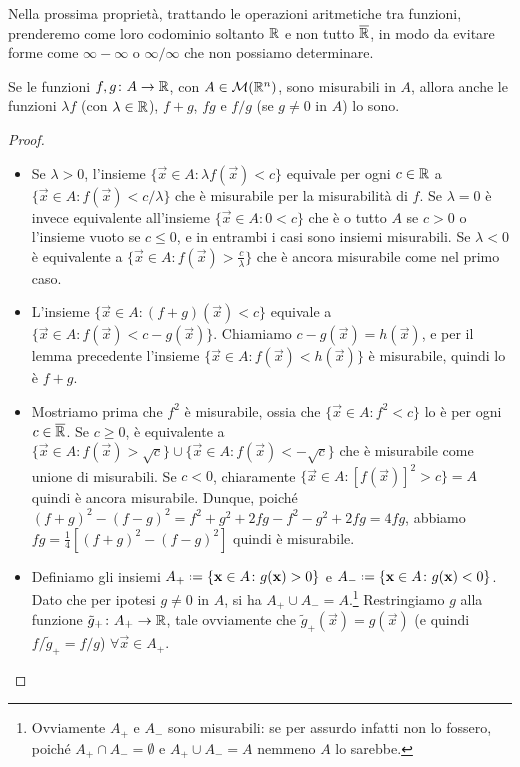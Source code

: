 Nella prossima proprietà, trattando le operazioni aritmetiche tra funzioni, prenderemo come loro codominio soltanto $\mathbb{R}$ e non tutto $\overline{\mathbb{R}}$, in modo da evitare forme come $\infty-\infty$ o $\infty/\infty$ che non possiamo determinare.
\begin{proprieta} \label{pr:operazioni-funzioni-misurabili}
	Se le funzioni $f,g\colon A\to\mathbb{R}$, con $A\in\mathcal M(\mathbb{R}^n)$, sono misurabili in $A$, allora anche le funzioni $\lambda f$ (con $\lambda\in\mathbb{R}$), $f+g$, $fg$ e $f/g$ (se $g\neq0$ in $A$) lo sono.
\end{proprieta}
\begin{proof}
	\begin{itemize}
		\item Se $\lambda>0$, l'insieme $\{\vec x\in A\colon \lambda f(\vec x)<c\}$ equivale per ogni $c\in\mathbb{R}$ a $\{\vec x\in A\colon f(\vec x)<c/\lambda\}$ che è misurabile per la misurabilità di $f$.
			Se $\lambda=0$ è invece equivalente all'insieme $\{\vec x\in A\colon 0<c\}$ che è o tutto $A$ se $c>0$ o l'insieme vuoto se $c\leq 0$, e in entrambi i casi sono insiemi misurabili.
			Se $\lambda<0$ è equivalente a $\{\vec x\in A\colon f(\vec x)>\frac{c}{\lambda}\}$ che è ancora misurabile come nel primo caso.
		\item L'insieme $\{\vec x\in A\colon (f+g)(\vec x)<c\}$ equivale a $\{\vec x\in A\colon f(\vec x)<c-g(\vec x)\}$.
			Chiamiamo $c-g(\vec x)=h(\vec x)$, e per il lemma precedente l'insieme $\{\vec x\in A\colon f(\vec x)<h(\vec x)\}$ è misurabile, quindi lo è $f+g$.
		\item Mostriamo prima che $f^2$ è misurabile, ossia che $\{\vec x\in A\colon f^2<c\}$ lo è per ogni $c\in\overline{\mathbb{R}}$.
			Se $c\geq 0$, è equivalente a $\{\vec x\in A\colon f(\vec x)>\sqrt{c}\}\cup\{\vec x\in A\colon f(\vec x)<-\sqrt{c}\}$ che è misurabile come unione di misurabili.
			Se $c<0$, chiaramente $\{\vec x\in A\colon [f(\vec x)]^2>c\}=A$ quindi è ancora misurabile.
			Dunque, poich\'e $(f+g)^2-(f-g)^2=f^2+g^2+2fg-f^2-g^2+2fg=4fg$, abbiamo $fg=\frac14[(f+g)^2-(f-g)^2]$ quindi è misurabile.
		\item Definiamo gli insiemi $A_+\defeq\{\vec x\in A\colon g(\vec x)>0\}$ e $A_-\defeq\{\vec x\in A\colon g(\vec x)<0\}$.
			Dato che per ipotesi $g\ne 0$ in $A$, si ha $A_+\cup A_-=A$.\footnote{
				Ovviamente $A_+$ e $A_-$ sono misurabili: se per assurdo infatti non lo fossero, poich\'e $A_+\cap A_-=\emptyset$ e $A_+\cup A_-=A$ nemmeno $A$ lo sarebbe.
			}
			Restringiamo $g$ alla funzione $\tilde g_+\colon A_+\to\mathbb{R}$, tale ovviamente che $\tilde g_+(\vec x)=g(\vec x)$ (e quindi $f/{\tilde g_+}=f/g$) $\forall\vec x\in A_+$.

\end{itemize}
\end{proof}
